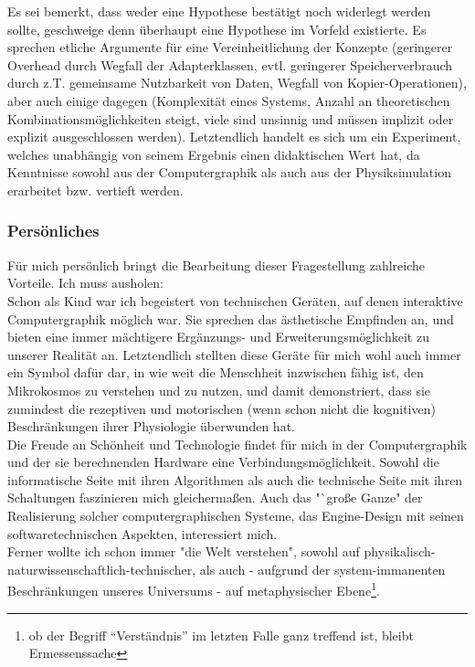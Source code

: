 Es sei bemerkt, dass weder eine Hypothese bestätigt noch widerlegt werden sollte, geschweige denn überhaupt eine 
Hypothese im Vorfeld existierte. Es sprechen etliche Argumente für eine Vereinheitlichung der Konzepte  (geringerer Overhead durch Wegfall der Adapterklassen, evtl. geringerer Speicherverbrauch durch z.T. gemeinsame Nutzbarkeit von Daten,
Wegfall von Kopier-Operationen), aber auch einige dagegen (Komplexität eines Systems, Anzahl an theoretischen Kombinationsmöglichkeiten steigt, viele sind unsinnig und müssen implizit oder explizit ausgeschlossen werden). Letztendlich handelt es sich um ein Experiment, welches
unabhängig von seinem Ergebnis einen didaktischen Wert hat, da Kenntnisse sowohl aus der Computergraphik als auch 
aus der Physiksimulation erarbeitet bzw. vertieft werden.\\



\subsubsection{Persönliches}
Für mich persönlich bringt die Bearbeitung dieser Fragestellung zahlreiche Vorteile. Ich muss ausholen:\\
Schon als Kind war ich begeistert von technischen Geräten, auf denen interaktive Computergraphik möglich war. Sie sprechen  das ästhetische Empfinden an, und bieten eine immer mächtigere Ergänzungs- und  Erweiterungsmöglichkeit zu unserer Realität an. Letztendlich stellten diese Geräte für mich wohl auch immer ein Symbol dafür dar, in wie weit die Menschheit inzwischen fähig ist, den Mikrokosmos zu verstehen und zu nutzen, und damit demonstriert, dass sie zumindest die rezeptiven und motorischen (wenn schon nicht die kognitiven) Beschränkungen ihrer Physiologie überwunden hat.\\
Die Freude an Schönheit und Technologie findet für mich in der Computergraphik und der sie berechnenden Hardware eine Verbindungsmöglichkeit. Sowohl die informatische Seite mit ihren Algorithmen als auch die technische Seite mit ihren Schaltungen faszinieren mich gleichermaßen. Auch das "`große Ganze" der Realisierung solcher computergraphischen Systeme, das Engine-Design mit seinen softwaretechnischen Aspekten, interessiert mich.\\
Ferner wollte ich schon immer "die Welt verstehen", sowohl auf physikalisch-naturwissenschaftlich-technischer, als auch - aufgrund der system-immanenten Beschränkungen unseres Universums - auf metaphysischer Ebene\footnote{ob der Begriff "`Verständnis"' im letzten Falle ganz treffend ist, bleibt Ermessenssache}.\\

